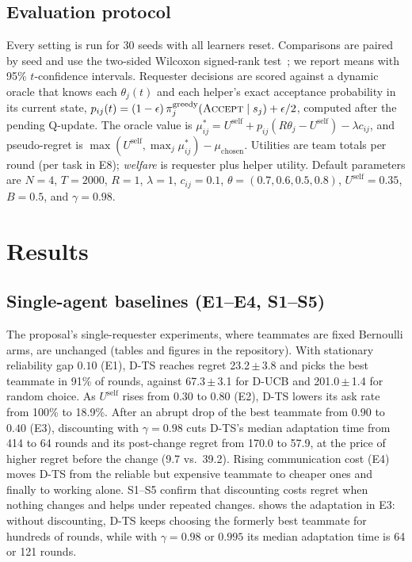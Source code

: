 \documentclass{article}
\newcommand{\Uself}{U^{\mathrm{self}}}
\newcommand{\ci}[2]{#1\,{\scriptsize$\pm$\,#2}}
\begin{document}
\subsection{Evaluation protocol}
Every setting is run for 30 seeds with all learners reset. Comparisons are paired by seed and use the two-sided Wilcoxon signed-rank test~\cite{wilcoxon1945individual}; we report means with 95\% $t$-confidence intervals. Requester decisions are scored against a dynamic oracle that knows each $\theta_j(t)$ and each helper's exact acceptance probability in its current state, $p_{ij}(t)=(1-\epsilon)\,\pi^{\mathrm{greedy}}_j(\textsc{Accept}\mid s_j)+\epsilon/2$, computed after the pending Q-update. The oracle value is $\mu^*_{ij}=\Uself+p_{ij}(R\theta_j-\Uself)-\lambda c_{ij}$, and pseudo-regret is $\max(\Uself,\max_j\mu^*_{ij})-\mu_{\mathrm{chosen}}$. Utilities are team totals per round (per task in E8); \emph{welfare} is requester plus helper utility. Default parameters are $N=4$, $T=2000$, $R=1$, $\lambda=1$, $c_{ij}=0.1$, $\theta=(0.7,0.6,0.5,0.8)$, $\Uself=0.35$, $B=0.5$, and $\gamma=0.98$.

\section{Results}\label{sec:results}

\subsection{Single-agent baselines (E1--E4, S1--S5)}
The proposal's single-requester experiments, where teammates are fixed Bernoulli arms, are unchanged (tables and figures in the repository). With stationary reliability gap $0.10$ (E1), D-TS reaches regret \ci{23.2}{3.8} and picks the best teammate in 91\% of rounds, against \ci{67.3}{3.1} for D-UCB and \ci{201.0}{1.4} for random choice. As $\Uself$ rises from $0.30$ to $0.80$ (E2), D-TS lowers its ask rate from 100\% to 18.9\%. After an abrupt drop of the best teammate from $0.90$ to $0.40$ (E3), discounting with $\gamma=0.98$ cuts D-TS's median adaptation time from 414 to 64 rounds and its post-change regret from 170.0 to 57.9, at the price of higher regret before the change (9.7 vs.\ 39.2). Rising communication cost (E4) moves D-TS from the reliable but expensive teammate to cheaper ones and finally to working alone. S1--S5 confirm that discounting costs regret when nothing changes and helps under repeated changes.  shows the adaptation in E3: without discounting, D-TS keeps choosing the formerly best teammate for hundreds of rounds, while with $\gamma=0.98$ or $0.995$ its median adaptation time is 64 or 121 rounds.
\end{document}

